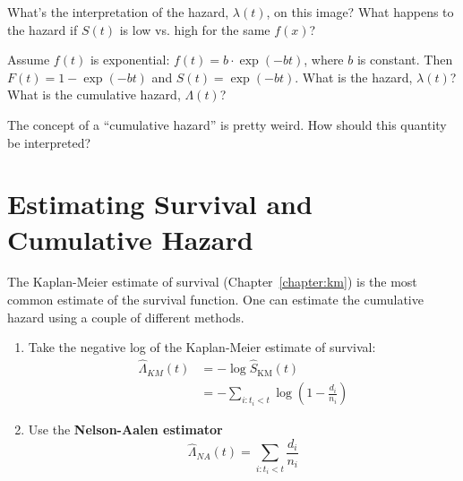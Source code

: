 \vspace{3mm}

\begin{question}{}
What's the interpretation of the hazard, $\lambda(t)$, on this image? What happens to the hazard if $S(t)$ is low vs. high for the same $f(x)$? 
\end{question}

\begin{question}{}
Assume $f(t)$ is exponential: $f(t) = b \cdot \exp(-bt)$, where $b$ is constant. Then $F(t) = 1 - \exp(-bt)$ and $S(t) = \exp(-bt)$. What is the hazard, $\lambda(t)$? What is the cumulative hazard, $\Lambda(t)$? 
\end{question}

\vspace{3mm}

\begin{question}{}
The concept of a ``cumulative hazard'' is pretty weird. How should this quantity be interpreted?
\end{question}


\section{Estimating Survival and Cumulative Hazard}

The Kaplan-Meier estimate of survival (Chapter~\ref{chapter:km}) is the most common estimate of the survival function. One can estimate the cumulative hazard using a couple of different methods. 
\begin{enumerate}
\item Take the negative log of the Kaplan-Meier estimate of survival:
\begin{align*} \hat{\Lambda}_{KM}(t) &= -\log \hat{S}_{\text{KM}}(t) \\
&= -\sum_{i:t_i < t} \log \left( 1 - \frac{d_i}{n_i} \right) \end{align*}
\item Use the \textbf{Nelson-Aalen estimator}
$$ \hat{\Lambda}_{NA}(t) = \sum_{i:t_i < t} \frac{d_i}{n_i} $$
\end{enumerate}

